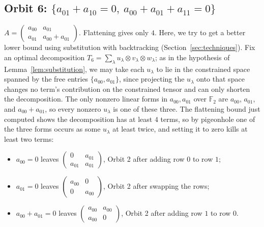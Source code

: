 \documentclass[11pt]{article}
\theoremstyle{definition}
\newcommand{\F}{\mathbb{F}}
\begin{document}
\subsection*{Orbit 6: $\{a_{01}+a_{10}=0,\ a_{00}+a_{01}+a_{11}=0\}$}
$A=
\begin{pmatrix}a_{00} & a_{01} \\a_{01}&a_{00}+a_{01}
\end{pmatrix}$. Flattening gives
only $4$. Here, we try to get a better lower bound using substitution with backtracking (Section~\ref{sec:techniques}).
Fix an optimal decomposition $T_6=\sum_\lambda u_\lambda\otimes v_\lambda\otimes
w_\lambda$; as in the hypothesis of Lemma~\ref{lem:substitution}, we may take each
$u_\lambda$ to lie in the constrained space spanned by the free entries
$\{a_{00},a_{01}\}$, since projecting the $u_\lambda$ onto that space changes no
term's contribution on the constrained tensor and can only shorten the
decomposition. The only nonzero linear forms in $a_{00},a_{01}$
over $\F_2$ are $a_{00}$, $a_{01}$, and $a_{00}+a_{01}$, so every nonzero
$u_\lambda$ is one of these three. The flattening bound just computed shows the
decomposition has at least $4$ terms, so
by pigeonhole one of the three forms occurs as some $u_\lambda$ at least twice, and
setting it to zero kills at least two terms:
\begin{itemize}
  \item $a_{00}=0$ leaves $
    \begin{pmatrix}0 & a_{01} \\a_{01}&a_{01}
    \end{pmatrix}$,
    Orbit 2 after adding row $0$ to row $1$;
  \item $a_{01}=0$ leaves $
    \begin{pmatrix}a_{00} & 0 \\0&a_{00}
    \end{pmatrix}$,
    Orbit 2 after swapping the rows;
  \item $a_{00}+a_{01}=0$ leaves $
    \begin{pmatrix}a_{00} & a_{00} \\a_{00}&0
    \end{pmatrix}$,
    Orbit 2 after adding row $1$ to row $0$.
\end{itemize}
\end{document}

